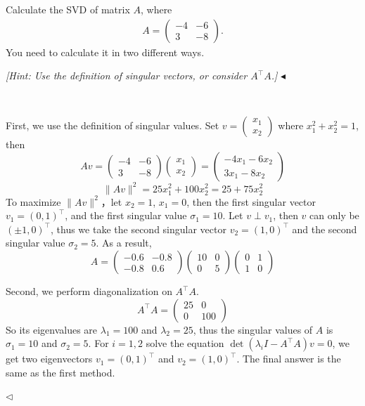 \documentclass[11pt]{article}
\newenvironment{problem}[2][Problem]{\begin{trivlist}
\item[\hskip \labelsep {\bfseries #1}\hskip \labelsep {\bfseries #2.}]}{\hfill$\blacktriangleleft$\end{trivlist}}
\newenvironment{answer}[1][Answer]{\begin{trivlist}
\item[\hskip \labelsep {\bfseries #1.}\hskip \labelsep]}{\hfill$\lhd$\end{trivlist}}
\begin{document}
\begin{problem}{4 (12')}
Calculate the SVD of matrix $A$, where 
\begin{align*}
    A=\begin{pmatrix}
        -4&-6\\3&-8
    \end{pmatrix}.
\end{align*} 
You need to calculate it in two different ways.

\textit{[Hint: Use the definition of singular vectors, or consider $A^\top A$.]}
\end{problem}

\begin{answer} ~

    First, we use the definition of singular values. Set $v = \begin{pmatrix} x_1 \\ x_2 \end{pmatrix}$ where $x_1^2 + x_2^2 = 1$, then
    \[Av = \begin{pmatrix} -4 & -6 \\ 3 & -8 \end{pmatrix} \begin{pmatrix} x_1 \\ x_2 \end{pmatrix} = \begin{pmatrix} -4x_1 -6x_2 \\ 3x_1 - 8x_2 \end{pmatrix}\]
    \[\|Av\|^2 = 25x_1^2 + 100x_2^2 = 25 + 75x_2^2\]
    To maximize $\|Av\|^2$，let $x_2 = 1$, $x_1 = 0$, then the first singular vector $v_1 = (0, 1)^\top$, and the first singular value $\sigma_1 = 10$. Let $v \perp v_1$, then $v$ can only be $(\pm 1, 0)^\top$, thus we take the second singular vector $v_2 = (1, 0)^\top$ and the second singular value $\sigma_2 = 5$. As a result,
    \[A = \begin{pmatrix} -0.6 & -0.8 \\ -0.8 & 0.6 \end{pmatrix} \begin{pmatrix} 10 & 0 \\ 0 & 5 \end{pmatrix} \begin{pmatrix} 0 & 1 \\ 1 & 0 \end{pmatrix}\]

    Second, we perform diagonalization on $A^\top A$. 
    \[A^\top A = \begin{pmatrix} 25 & 0 \\ 0 & 100 \end{pmatrix}\]
    So its eigenvalues are $\lambda_1 = 100$ and $\lambda_2 = 25$, thus the singular values of $A$ is $\sigma_1 = 10$ and $\sigma_2 = 5$. For $i = 1, 2$ solve the equation $\det(\lambda_i I - A^\top A)v = 0$, we get two eigenvectors $v_1 = (0, 1)^\top$ and $v_2 = (1, 0)^\top$. The final answer is the same as the first method.
    
\end{answer}
\end{document}
